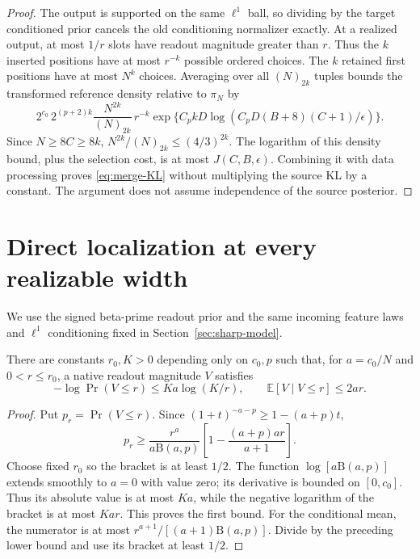 \begin{proof}
The output is supported on the same $\ell^1$ ball, so dividing by the target
conditioned prior cancels the old conditioning normalizer exactly.
At a realized output, at most $1/r$ slots have readout magnitude greater
than $r$. Thus the $k$ inserted positions have at most $r^{-k}$ possible
ordered choices. The $k$ retained first positions have at most $N^k$
choices. Averaging over all $(N)_{2k}$ tuples bounds the transformed
reference density relative to $\pi_N$ by
\[
 2^{c_0}\,2^{(p+2)k}
 \frac{N^{2k}}{(N)_{2k}}\,r^{-k}
 \exp\{C_pkD\log(C_pD(B+8)(C+1)/\epsilon)\}.
\]
Since $N\ge8C\ge8k$, $N^{2k}/(N)_{2k}\le(4/3)^{2k}$.
The logarithm of this density bound, plus the selection cost, is at
most $J(C,B,\epsilon)$. Combining it with data processing proves
\eqref{eq:merge-KL} without multiplying the source KL by a constant.
The argument does not assume independence of the source posterior.
\end{proof}

\section{Direct localization at every realizable width}
\label{sec:direct-localization}
We use the signed beta-prime readout prior and the same incoming
feature laws and $\ell^1$ conditioning fixed in Section~\ref{sec:sharp-model}.

\begin{lemma}
\label{lem:beta-background}
There are constants $r_0,K>0$ depending only on $c_0,p$ such that, for
$a=c_0/N$ and $0<r\le r_0$, a native readout magnitude $V$ satisfies
\[
 -\log\Pr(V\le r)\le Ka\log(K/r),\qquad
 \mathbb E[V\mid V\le r]\le2ar.
\]
\end{lemma}
\begin{proof}
Put $p_r=\Pr(V\le r)$. Since $(1+t)^{-a-p}\ge1-(a+p)t$,
\[
 p_r\ge\frac{r^a}{a\mathrm B(a,p)}
       \left[1-\frac{(a+p)ar}{a+1}\right].
\]
Choose fixed $r_0$ so the bracket is at least $1/2$. The function
$\log[a\mathrm B(a,p)]$ extends smoothly to $a=0$ with value zero;
its derivative is bounded on $[0,c_0]$. Thus its absolute value is at
most $Ka$, while the negative logarithm of the bracket is at most
$Kar$. This proves the first bound. For the conditional mean, the
numerator is at most $r^{a+1}/[(a+1)\mathrm B(a,p)]$. Divide by the
preceding lower bound and use its bracket at least $1/2$.
\end{proof}

